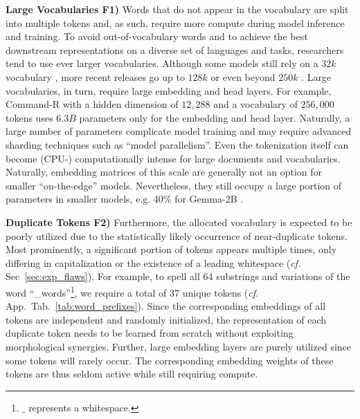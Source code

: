\documentclass[11pt]{article}
\newcommand\todo[1]{\textcolor{red}{#1}}
\newcommand{\mb}[1]{\textcolor{blue}{MB: #1}}
\begin{document}
\textbf{Large Vocabularies F1)} Words that do not appear in the vocabulary are split into multiple tokens and, as such, require more compute during model inference and training.
To avoid out-of-vocabulary words and to achieve the best downstream representations on a diverse set of languages and tasks,
researchers tend to use ever larger vocabularies. Although some models still rely on a $32k$ vocabulary \cite{touvron2023llama2, jiang2023mistral}, more recent releases go up to $128k$ \cite{meta2024llama3} or even beyond $250k$ \cite{mesnard2024gemma, cohere2024commandr}. 
Large vocabularies, in turn, require large embedding and head layers. 
For example, Command-R \cite{cohere2024commandr} with a hidden dimension of $12,288$ and a vocabulary of $256,000$ tokens uses $6.3B$ parameters only for the embedding and head layer.
Naturally, a large number of parameters complicate model training and may require 
advanced sharding techniques such as ``model parallelism''.
Even the tokenization itself can become \mbox{(CPU-)} computationally intense for large documents and vocabularies.
Naturally, embedding matrices of this scale are generally not an option for smaller ``on-the-edge'' models. 
Nevertheless, they still occupy a large portion of parameters in smaller models, e.g. 40\% for Gemma-2B \cite{mesnard2024gemma}. 


\textbf{Duplicate Tokens F2)} Furthermore, the allocated vocabulary is expected to be poorly utilized due to the statistically likely occurrence of near-duplicate tokens. 
Most prominently, a significant portion of tokens appears multiple times, only differing in capitalization or the existence of a leading whitespace (\emph{cf.} Sec~\ref{sec:exp_flaws}).
For example, to spell all 64 substrings and variations of the word ``\_words''\footnote{$\_$ represents a whitespace.}, we require a total of 37 unique tokens (\emph{cf.} App.~Tab.~\ref{tab:word_prefixes}). 
Since the corresponding embeddings of all tokens are independent and randomly initialized, the representation of each duplicate token needs to be learned from scratch without exploiting morphological synergies.
Further, large embedding layers are purely utilized since some tokens will rarely occur. The corresponding embedding weights of these tokens are thus seldom active while still requiring compute.
\end{document}
